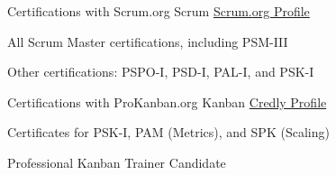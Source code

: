 {
}


\begin{cventries}

	\cventry
	{
		{Certifications with Scrum.org}
	} %
	{
		{Scrum}
	} %
	{
		\href{https://www.scrum.org/user/601291}{
			{ Scrum.org Profile}
		}
	} %
	{
	} %
	{
		\begin{cvitems} %
			\item {
				{All Scrum Master certifications, including PSM-III}
			}
			\item {
				{Other certifications: PSPO-I, PSD-I, PAL-I, and PSK-I}
			}		
		\end{cvitems}
	}
  	\cventry
  	{  		
  		{Certifications with ProKanban.org}
  	} %
  	{
  		Kanban
  	} %
  	{
  		\href{https://www.credly.com/users/benjamin-huser}{
			{Credly Profile}
		}
  	} %
  	{
  	} %
  	{
  		\begin{cvitems} %
  			\item {
  				{Certificates for PSK-I, PAM (Metrics), and SPK (Scaling)}
  			}
  			\item {
  				{Professional Kanban Trainer Candidate}
  			}
  		\end{cvitems}
  	}
  	
  	\cventry
  	{ 	}
  	{  	}
  	{  	}
  	{  	}
  	{  	}
\end{cventries}
